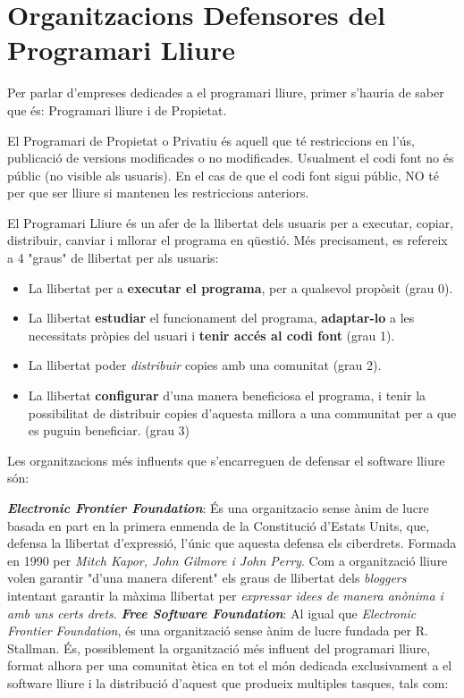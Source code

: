 \section{Organitzacions Defensores del Programari Lliure}

Per parlar d'empreses dedicades a el programari lliure, primer s'hauria de saber que és: Programari lliure i de Propietat.

El Programari de Propietat o Privatiu és aquell que té restriccions en l'ús, publicació de versions modificades o no modificades. Usualment el codi font no és públic (no visible als usuaris). En el cas de que el codi font sigui públic, NO té per que ser lliure si mantenen les restriccions anteriors. \cite{ProgPro}

El Programari Lliure és un afer de la llibertat dels usuaris per a executar, copiar, distribuir, canviar i mllorar el programa en qüestió. Més precisament, es refereix a 4 "graus" de llibertat per als usuaris:

	\begin{itemize}
		\item La llibertat per a \textbf{executar el programa}, per a qualsevol propòsit (grau  0).
		\item La llibertat \textbf{estudiar} el funcionament del programa, \textbf{adaptar-lo} a les 			necessitats pròpies del usuari i \textbf{tenir accés al codi font} (grau 1).
		\item La llibertat poder \textit{distribuir} copies amb una comunitat (grau 2).
		\item La llibertat \textbf{configurar} d'una manera beneficiosa el programa, i tenir la 		possibilitat de	distribuir copies d'aquesta millora a una communitat per a que es puguin 			beneficiar. (grau 3)
	\end{itemize}

Les organitzacions més influents que s'encarreguen de defensar el software lliure són: 
 
\textbf{\emph{Electronic Frontier Foundation}}: És una organitzacio sense ànim de lucre basada en part en la primera enmenda de la Constitució d'Estats Units, que, defensa la llibertat d'expressió, l'únic que aquesta defensa els ciberdrets. Formada en 1990 per \textit{Mitch Kapor, John Gilmore i John Perry}. Com a organització lliure volen garantir "d'una manera diferent" els graus de llibertat dels \emph{bloggers} intentant garantir la màxima llibertat per \textit{expressar idees de manera anònima i amb uns certs drets}. \cite{OrgDefEFF}
 \cite{OrgDefEFFII}
\textbf{\emph{Free Software Foundation}}: Al igual que \emph{Electronic Frontier Foundation}, és una 		organització sense ànim de lucre fundada per R. Stallman. És, possiblement la organització més 		influent del programari lliure, format alhora per una comunitat ètica en tot el món dedicada 		exclusivament a el software lliure i la distribució d'aquest que produeix multiples tasques, tals com:

